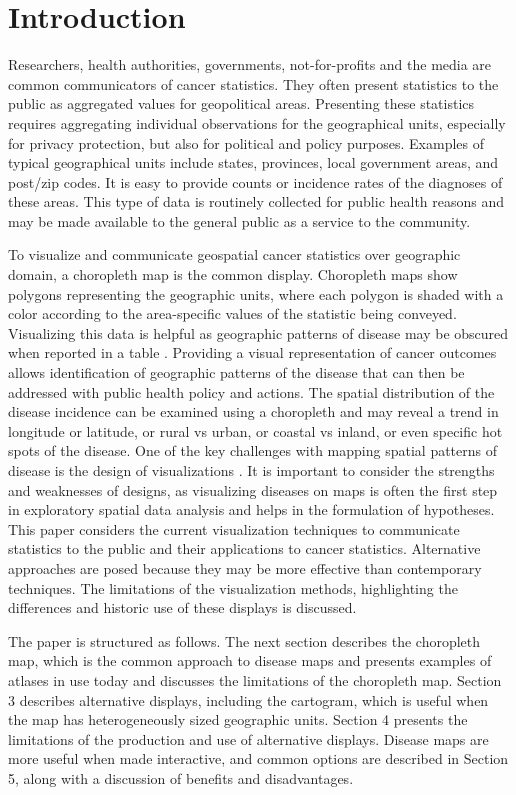 \documentclass{monashthesis}
\begin{document}
\hypertarget{introduction}{%
\section{Introduction}\label{introduction}}

Researchers, health authorities, governments, not-for-profits and the media are common communicators of cancer statistics. They often present statistics to the public as aggregated values for geopolitical areas. Presenting these statistics requires aggregating individual observations for the geographical units, especially for privacy protection, but also for political and policy purposes. Examples of typical geographical units include states, provinces, local government areas, and post/zip codes. It is easy to provide counts or incidence rates of the diagnoses of these areas. This type of data is routinely collected for public health reasons and may be made available to the general public as a service to the community.

To visualize and communicate geospatial cancer statistics over geographic domain, a choropleth map is the common display. Choropleth maps show polygons representing the geographic units, where each polygon is shaded with a color according to the area-specific values of the statistic being conveyed. Visualizing this data is helpful as geographic patterns of disease may be obscured when reported in a table \autocite{SAMGIS}. Providing a visual representation of cancer outcomes allows identification of geographic patterns of the disease that can then be addressed with public health policy and actions. The spatial distribution of the disease incidence can be examined using a choropleth and may reveal a trend in longitude or latitude, or rural vs urban, or coastal vs inland, or even specific hot spots of the disease. One of the key challenges with mapping spatial patterns of disease is the design of visualizations \autocite{SE}. It is important to consider the strengths and weaknesses of designs, as visualizing diseases on maps is often the first step in exploratory spatial data analysis and helps in the formulation of hypotheses. This paper considers the current visualization techniques to communicate statistics to the public and their applications to cancer statistics. Alternative approaches are posed because they may be more effective than contemporary techniques. The limitations of the visualization methods, highlighting the differences and historic use of these displays is discussed.

The paper is structured as follows. The next section describes the choropleth map, which is the common approach to disease maps and presents examples of atlases in use today and discusses the limitations of the choropleth map. Section 3 describes alternative displays, including the cartogram, which is useful when the map has heterogeneously sized geographic units. Section 4 presents the limitations of the production and use of alternative displays. Disease maps are more useful when made interactive, and common options are described in Section 5, along with a discussion of benefits and disadvantages.
\end{document}
